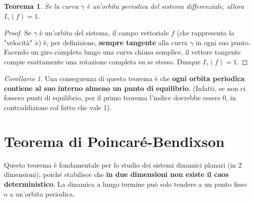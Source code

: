 \documentclass[openany]{book}
\newtheorem*{teorema}{Teorema}
\theoremstyle{definition}
\theoremstyle{remark}
\newtheorem{corollario}{Corollario}
\begin{document}
\begin{center}
\end{center}


\begin{teorema}
Se la curva $\gamma$ è un'orbita periodica del sistema differenziale, allora $I_\gamma(f) = 1$.
\end{teorema}

\begin{proof}
Se $\gamma$ è un'orbita del sistema, il campo vettoriale $f$ (che rappresenta la "velocità" $\dot{x}$) è, per definizione, \textbf{sempre tangente} alla curva $\gamma$ in ogni suo punto. Facendo un giro completo lungo una curva chiusa semplice, il vettore tangente compie esattamente una rotazione completa su se stesso. Dunque $I_\gamma(f) = 1$.
\end{proof}

\begin{corollario}
Una conseguenza di questo teorema è che \textbf{ogni orbita periodica contiene al suo interno almeno un punto di equilibrio}. (Infatti, se non ci fossero punti di equilibrio, per il primo teorema l'indice dovrebbe essere 0, in contraddizione col fatto che vale 1).
\end{corollario}


\section{Teorema di Poincaré-Bendixson}

Questo teorema è fondamentale per lo studio dei sistemi dinamici planari (in 2 dimensioni), poiché stabilisce che \textbf{in due dimensioni non esiste il caos deterministico}. La dinamica a lungo termine può solo tendere a un punto fisso o a un'orbita periodica.
\end{document}
